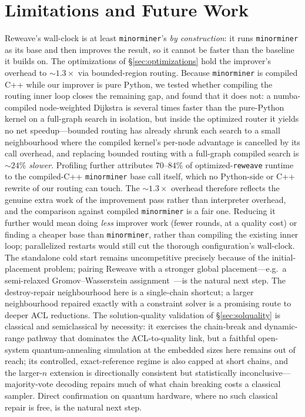 \documentclass[acmsmall,anonymous,nonacm]{acmart}
\begin{document}
\section{Limitations and Future Work}
\label{sec:limitations}

Reweave's wall-clock is at least \texttt{minorminer}'s \emph{by construction}:
it runs \texttt{minorminer} as its base and then improves the result, so it cannot
be faster than the baseline it builds on. The optimizations of
\S\ref{sec:optimizations} hold the improver's overhead to ${\sim}1.3\times$ via
bounded-region routing. Because \texttt{minorminer} is compiled C++ while our
improver is pure Python, we tested whether compiling the routing inner loop closes
the remaining gap, and found that it does not: a numba-compiled node-weighted
Dijkstra is several times faster than the pure-Python kernel on a full-graph search
in isolation, but inside the optimized router it yields no net speedup---bounded
routing has already shrunk each search to a small neighbourhood where the compiled
kernel's per-node advantage is cancelled by its call overhead, and replacing
bounded routing with a full-graph compiled search is ${\sim}24\%$ \emph{slower}.
Profiling further attributes $70$--$84\%$ of optimized-\texttt{reweave} runtime
to the compiled-C++ \texttt{minorminer} base call itself, which no Python-side or
C++ rewrite of our routing can touch. The ${\sim}1.3\times$ overhead therefore
reflects the genuine extra work of the improvement pass rather than interpreter
overhead, and the comparison against compiled \texttt{minorminer} is a fair one.
Reducing it further would mean doing \emph{less} improver work (fewer rounds, at a
quality cost) or finding a cheaper base than \texttt{minorminer}, rather than
compiling the existing inner loop; parallelized restarts would still cut the
thorough configuration's wall-clock. The standalone cold start
remains uncompetitive precisely because of the initial-placement problem; pairing
Reweave with a stronger global placement---e.g.\ a semi-relaxed
Gromov--Wasserstein assignment~\cite{vincentcuaz2022srgw}---is the natural next
step. The destroy-repair neighbourhood here is a single-chain shortcut;
a larger neighbourhood repaired exactly with a constraint solver
\cite{bernal2020ip} is a promising route to deeper ACL reductions. The
solution-quality validation of \S\ref{sec:solquality} is classical and semiclassical
by necessity: it exercises the chain-break and dynamic-range pathway that dominates
the ACL-to-quality link, but a faithful open-system quantum-annealing simulation at
the embedded sizes here remains out of reach; its controlled, exact-reference
regime is also capped at short chains, and the larger-$n$ extension is
directionally consistent but statistically inconclusive---majority-vote decoding
repairs much of what chain breaking costs a classical sampler. Direct confirmation
on quantum hardware, where no such classical repair is free, is the natural next
step.
\end{document}
